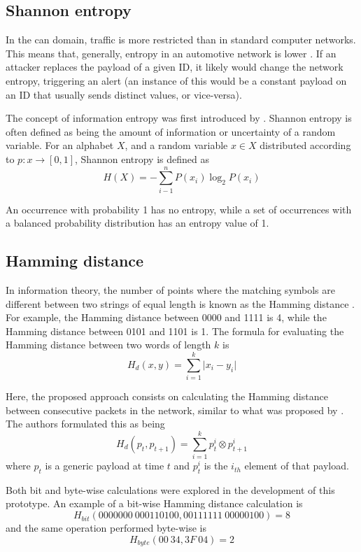 \subsection{Shannon entropy}

In the \gls{can} domain, traffic is more restricted than in standard computer networks. This means that, generally, entropy in an automotive network is lower \citep{muter2011entropy}. If an attacker replaces the payload of a given ID, it likely would change the network entropy, triggering an alert (an instance of this would be a constant payload on an ID that usually sends distinct values, or vice-versa).\par
The concept of information entropy was first introduced by \cite{shannon1948}. Shannon entropy is often defined as being the amount of information or uncertainty of a random variable. For an alphabet $X$, and a random variable $x \in X$ distributed according to $p: x \rightarrow [0, 1]$, Shannon entropy is defined as \[H(X) = - \sum_{i - 1}^{n} P(x_i) \log_2 P(x_i)\]\par
An occurrence with probability 1 has no entropy, while a set of occurrences with a balanced probability distribution has an entropy value of 1. 

\subsection{Hamming distance}

In information theory, the number of points where the matching symbols are different between two strings of equal length is known as the Hamming distance \citep{hamming1950}. For example, the Hamming distance between 0000 and 1111 is 4, while the Hamming distance between 0101 and 1101 is 1. The formula for evaluating the Hamming distance between two words of length $k$ is \[H_d(x, y) = \sum_{i = 1}^{k} \vert x_i - y_i \vert\]\par

Here, the proposed approach consists on calculating the Hamming distance between consecutive packets in the network, similar to what was proposed by \cite{stabili2017}. The authors formulated this as being \[H_d(p_t, p_{t + 1}) = \sum_{i = 1}^{k} p_{t}^{i} \otimes p_{t + 1}^{i}\] where $p_t$ is a generic payload at time $t$ and $p_t^i$ is the $i_{th}$ element of that payload.

Both bit and byte-wise calculations were explored in the development of this prototype. An example of a bit-wise Hamming distance calculation is \[H_{bit}(0000000\ 000110100, 00111111\ 00000100) = 8\]
and the same operation performed byte-wise is \[H_{byte}(00\ 34, 3F\ 04) = 2\]

